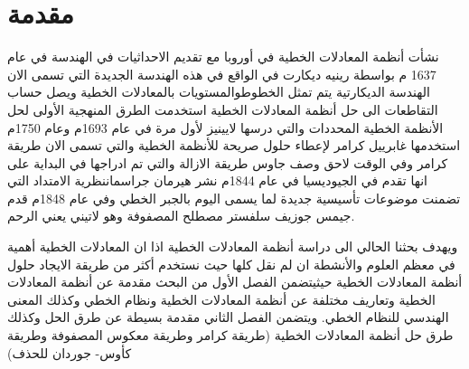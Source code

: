 \chapter*{مقدمة}

نشأت أنظمة المعادلات الخطية في أوروبا مع تقديم الاحداثيات في الهندسة في عام 1637 م بواسطة رينيه ديكارت في الواقع في هذه الهندسة الجديدة التي تسمى الان الهندسة الديكارتية يتم تمثل الخطوطوالمستويات بالمعادلات الخطية ويصل حساب التقاطعات الى حل أنظمة المعادلات الخطية استخدمت الطرق المنهجية الأولى لحل الأنظمة الخطية المحددات والتي درسها لايينيز لأول مرة في عام 1693م وعام 1750م استخدمها غابرييل كرامر لإعطاء حلول صريحة للأنظمة الخطية والتي تسمى الان طريقة كرامر وفي الوقت لاحق وصف جاوس طريقة الازالة والتي تم ادراجها في البداية على انها تقدم في الجيوديسيا في عام 1844م نشر هيرمان جراسماننظرية الامتداد التي تضمنت موضوعات تأسيسية جديدة لما يسمى اليوم بالجبر الخطي وفي عام 1848م قدم جيمس جوزيف سلفستر مصطلح المصفوفة وهو لاتيني يعني الرحم. 

ويهدف بحثنا الحالي الى دراسة أنظمة المعادلات الخطية اذا ان المعادلات الخطية أهمية في معظم العلوم والأنشطة ان لم نقل كلها حيث نستخدم أكثر من طريقة الايجاد حلول أنظمة المعادلات الخطية حيثيتضمن الفصل الأول من البحث مقدمة عن أنظمة المعادلات الخطية وتعاريف مختلفة عن أنظمة المعادلات الخطية ونظام الخطي وكذلك المعنى الهندسي للنظام الخطي. ويتضمن الفصل الثاني مقدمة بسيطة عن طرق الحل وكذلك طرق حل أنظمة المعادلات الخطية (طريقة كرامر وطريقة معكوس المصفوفة وطريقة كأوس- جوردان للحذف) 
